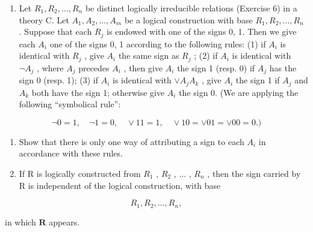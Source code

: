 \begin{enumerate}
\def\labelenumi{\arabic{enumi}.}
\setcounter{enumi}{6}
\tightlist
\item
  Let \(R_{1}, R_{2}, \ldots, R_{n}\) be distinct logically irreducible relations (Exercise 6) in a theory C. Let \(A_{1}, A_{2}, \ldots, A_{m}\) be a logical construction with base \(R_{1}, R_{2}, \ldots, R_{n}\) . Suppose that each \(R_{j}\) is endowed with one of the signs 0, 1. Then we give each \(A_{i}\) one of the signs 0, 1 according to the following rules: (1) if \(A_{i}\) is identical with \(R_{j}\) , give \(A_{i}\) the same sign as \(R_{j}\) ; (2) if \(A_{i}\) is identical with \(\neg A_{j}\) , where \(A_{j}\) precedes \(A_{i}\) , then give \(A_{i}\) the sign 1 (resp. 0) if \(A_{j}\) has the sign 0 (resp. 1); (3) if \(A_{i}\) is identical with \(\vee A_{j}A_{k}\) , give \(A_{i}\) the sign 1 if \(A_{j}\) and \(A_{k}\) both have the sign 1; otherwise give \(A_{i}\) the sign 0. (We are applying the following ``symbolical rule'':
\end{enumerate}

\[
\neg 0 = 1, \quad \neg 1 = 0, \quad \vee 1 1 = 1, \quad \vee 1 0 = \vee 0 1 = \vee 0 0 = 0.)
\]

\begin{enumerate}
\def\labelenumi{(\alph{enumi})}
\item
  Show that there is only one way of attributing a sign to each \(A_{i}\) in accordance with these rules.
\item
  If R is logically constructed from \(R_{1}\) , \(R_{2}\) , \(\ldots\) , \(R_{n}\) , then the sign carried by R is independent of the logical construction, with base
\end{enumerate}

\[
R _ {1}, R _ {2}, \dots , R _ {n},
\]

in which \(\pmb{R}\) appears.

